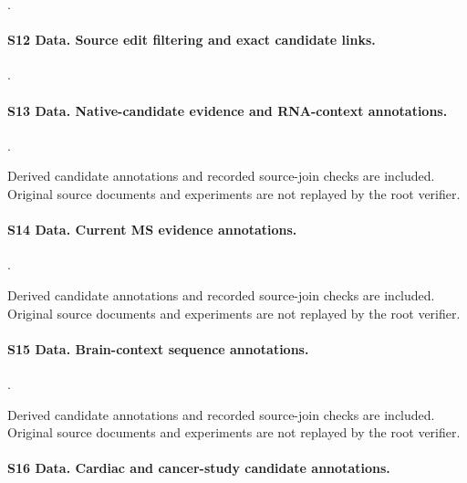 \documentclass[11pt,a4paper]{article}
\begin{document}
{\raggedright {}.\par}

\paragraph{S12 Data. Source edit filtering and exact candidate links.}

{\raggedright {}.\par}

\paragraph{S13 Data. Native-candidate evidence and RNA-context annotations.}

{\raggedright {}.\par}

Derived candidate annotations and recorded source-join checks are included. Original source documents and experiments are not replayed by the root verifier.

\paragraph{S14 Data. Current MS evidence annotations.}

{\raggedright {}.\par}

Derived candidate annotations and recorded source-join checks are included. Original source documents and experiments are not replayed by the root verifier.

\paragraph{S15 Data. Brain-context sequence annotations.}

{\raggedright {}.\par}

Derived candidate annotations and recorded source-join checks are included. Original source documents and experiments are not replayed by the root verifier.

\paragraph{S16 Data. Cardiac and cancer-study candidate annotations.}
\end{document}
